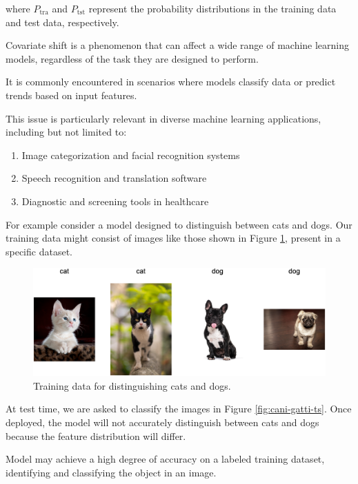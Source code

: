 	where $P_{\text{tra}}$ and $P_{\text{tst}}$ represent the probability distributions in the training data and test data, respectively.  
	\vspace{0.5cm}  
	
Covariate shift is a phenomenon that can affect a wide range of machine learning models, regardless of the task they are designed to perform.

It is commonly encountered in scenarios where models classify data or predict trends based on input features.

This issue is particularly relevant in diverse machine learning applications, including but not limited to:
	
	\begin{enumerate}
		\item Image categorization and facial recognition systems
		\item Speech recognition and translation software
		\item Diagnostic and screening tools in healthcare
	\end{enumerate}
	
For example consider a model designed to distinguish between cats and dogs. Our training data might consist of images like those shown in Figure \ref{fig:cani-gatti-tr}, present in a specific dataset.
	
	\vspace{1cm}
	\begin{figure}[H]
		\centering
		\includegraphics[width=1\textwidth]{assets/cat-dog-train.png} 
		\caption{Training data for distinguishing cats and dogs.}
		\label{fig:cani-gatti-tr}
	\end{figure}
     \vspace{1cm}
     

At test time, we are asked to classify the images in Figure \ref{fig:cani-gatti-ts}. Once deployed, the model will not accurately distinguish between cats and dogs because the feature distribution will differ.

Model may achieve a high degree of accuracy on a labeled training dataset, identifying and classifying the object in an image. 

